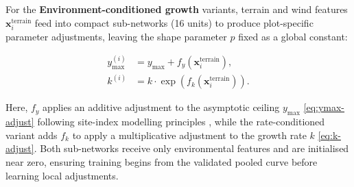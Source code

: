 \documentclass[logo,msc,ai]{infthesis}           %
\begin{document}
For the \textbf{Environment-conditioned growth} variants, terrain and wind features $\mathbf{x}^{\text{terrain}}_i$ feed into compact sub-networks (16 units) to produce plot-specific parameter adjustments, leaving the shape parameter $p$ fixed as a global constant:

\begin{subequations}
\label{eq:env-adjustments}
\begin{align}
y_{\max}^{(i)} &= y_{\max} + f_{y}\!\left(\mathbf{x}^{\text{terrain}}_i\right), \label{eq:ymax-adjust} \\
k^{(i)} &= k \cdot \exp\!\left(f_{k}\!\left(\mathbf{x}^{\text{terrain}}_i\right)\right). \label{eq:k-adjust}
\end{align}
\end{subequations}

Here, $f_y$ applies an additive adjustment to the asymptotic ceiling $y_{\max}$ \eqref{eq:ymax-adjust} following site-index modelling principles \cite{socha2023Higher_C1_SS}, while the rate-conditioned variant adds $f_k$ to apply a multiplicative adjustment to the growth rate $k$ \eqref{eq:k-adjust}. Both sub-networks receive only environmental features and are initialised near zero, ensuring training begins from the validated pooled curve before learning local adjustments.
\end{document}
